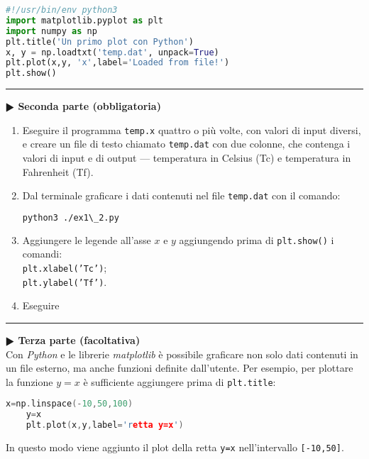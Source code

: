\documentclass[11pt]{article}
\begin{document}
\newpage
\begin{lstlisting}[caption={Programma {\it python} \texttt{ex1\_2.py}},language=Python]
#!/usr/bin/env python3
import matplotlib.pyplot as plt
import numpy as np
plt.title('Un primo plot con Python')
x, y = np.loadtxt('temp.dat', unpack=True)
plt.plot(x,y, 'x',label='Loaded from file!')
plt.show()
\end{lstlisting}

\hrule
\vspace{2mm}
\textbf{$\RHD$ Seconda parte (obbligatoria)} 
%
\begin{enumerate}
\item Eseguire il programma \texttt{temp.x} quattro o pi\`u volte, con valori di input diversi, e creare un file di testo chiamato \texttt{temp.dat} con due colonne,
  che contenga i valori di input e di output --- temperatura in Celsius (Tc) e
  temperatura in Fahrenheit (Tf).
\item Dal terminale graficare i dati contenuti nel file \texttt{temp.dat} con il comando:\\
  \begin{lstlisting}[language=bash,numbers=none]
python3 ./ex1\_2.py
\end{lstlisting}
\item Aggiungere le legende all'asse $x$ e $y$ aggiungendo prima di \texttt{plt.show()} i comandi:
\\
\texttt{plt.xlabel('Tc')};
\\
\texttt{plt.ylabel('Tf')}.
 \item Eseguire 
 \end{enumerate}


\hrule
\vspace{2mm}\textbf{$\RHD$ Terza parte (facoltativa)\\}
%
Con {\it Python\/} e le librerie {\it matplotlib\/} \`e possibile graficare non solo dati contenuti in un file esterno, ma anche funzioni definite dall'utente. Per esempio, 
per plottare la funzione $y=x$ \`e sufficiente aggiungere prima di \texttt{plt.title}: 
\begin{lstlisting}[language=c]
    x=np.linspace(-10,50,100)
    y=x
    plt.plot(x,y,label='retta y=x')
\end{lstlisting}
In questo modo viene aggiunto il plot della retta \texttt{y=x} nell'intervallo \texttt{[-10,50]}. 
\end{document}
